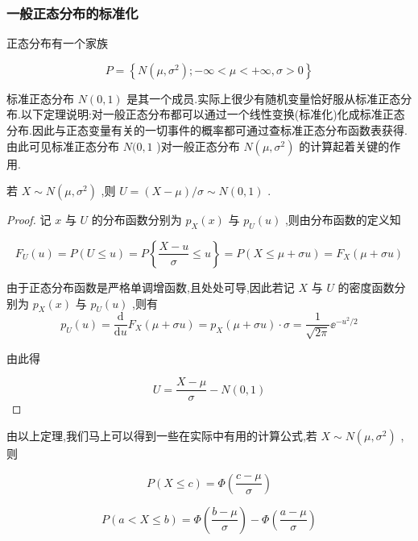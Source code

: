 \subsubsection{一般正态分布的标准化}

正态分布有一个家族

\[
P=\left\{N\left(\mu, \sigma^{2}\right) ;-\infty<\mu<+\infty, \sigma>0\right\}
\]

标准正态分布 $ N(0,1) $ 是其一个成员.实际上很少有随机变量恰好服从标准正态分布.以下定理说明:对一般正态分布都可以通过一个线性变换(标准化)化成标准正态分布.因此与正态变量有关的一切事件的概率都可通过查标准正态分布函数表获得.由此可见标准正态分布 $ N(0,1 $ )对一般正态分布 $ N\left(\mu, \sigma^{2}\right) $ 的计算起着关键的作用.

\begin{theorem}{}{}
	若 $ X \sim N\left(\mu, \sigma^{2}\right) $ ,则 $ U=(X-\mu) / \sigma \sim N(0,1) $ .
\end{theorem}

\begin{proof}
	记 $ x $ 与 $ U $ 的分布函数分别为 $ p_{X}(x) $ 与 $ p_{U}(u) $ ,则由分布函数的定义知
	
	\[
	F_{U}(u)=P(U \leqslant u)=P\left\{\frac{X-u}{\sigma} \leqslant u\right\}=P(X \leqslant \mu+\sigma u)=F_{X}(\mu+\sigma u)
	\]
	
	由于正态分布函数是严格单调增函数,且处处可导,因此若记 $ X $ 与 $ U $ 的密度函数分别为 $ p_{X}(x) $ 与 $ p_{U}(u) $ ,则有
	\[
	p_{U}(u)=\frac{\mathrm{d}}{\mathrm{d} u} F_{X}(\mu+\sigma u)=p_{X}(\mu+\sigma u) \cdot \sigma=\frac{1}{\sqrt{2 \pi}} \ee ^{-u^{2} / 2}
	\]
	
	由此得
	
	\[
	U=\frac{X-\mu}{\sigma}-N(0,1)
	\]
\end{proof}


由以上定理,我们马上可以得到一些在实际中有用的计算公式,若 $ X \sim N\left(\mu, \sigma^{2}\right) $ ,则

\begin{equation}
P(X \leqslant c)=\Phi\left(\frac{c-\mu}{\sigma}\right) \label{eq:2.5.3}
\end{equation}

\begin{equation}
P(a<X \leqslant b)=\Phi\left(\frac{b-\mu}{\sigma}\right)-\Phi\left(\frac{a-\mu}{\sigma}\right) \label{eq:2.5.4}
\end{equation}

